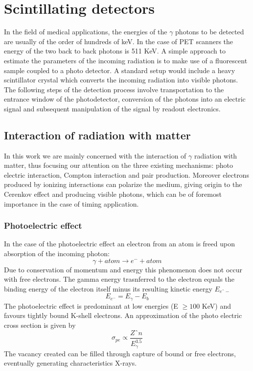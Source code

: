

\chapter{Scintillating detectors}

In the field of medical applications, the energies of the $\gamma$ photons to be detected are usually of the order of hundreds of keV. In the case of PET scanners the energy of the two back to back photons is 511 KeV.
A simple approach to estimate the parameters of the incoming radiation is to make use of a fluorescent sample coupled to a photo detector. A standard setup would include a heavy scintillator crystal which converts the incoming radiation into visible photons. The following steps of the detection process involve transportation to the entrance window of the photodetector, conversion of the photons into an electric signal and subsequent manipulation of the signal by readout electronics.  


\section{Interaction of radiation with matter}
In this work we are mainly concerned with the interaction of $\gamma$ radiation with matter, thus focusing our attention on the three existing mechanisms: photo electric interaction, Compton interaction and pair production.
Moreover electrons produced by ionizing interactions can polarize the medium, giving origin to the Cerenkov effect and producing visible photons, which can be of foremost importance in the case of timing application.

\subsection{Photoelectric effect}

In the case of the photoelectric effect an electron from an atom is freed upon absorption of the incoming photon:
\begin{equation}
\gamma + atom \rightarrow e^{-} + atom
\end{equation}
Due to conservation of momentum and energy this phenomenon does not occur with free electrons. 
The gamma energy trasnferred to the electron equals the binding energy of the electron itself minus its resulting kinetic energy $E_{eˆ{-}}$ 
\begin{equation}
E_{e^{-}} = E_{\gamma} - E_{b}
\end{equation}
The photoelectric effect is predominant at low energies (E $\geq 100$ KeV) and favours tightly bound K-shell electrons. An approximation of the photo electric cross section is given by
\begin{equation}
\sigma _{pe} \propto \frac{Zˆ{n}}{E_{\gamma}^{3.5}}
\end{equation}
The vacancy created can be filled through capture of bound or free electrons, eventually generating characteristics X-rays.  


